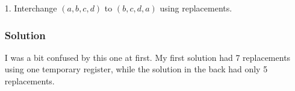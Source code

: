 
\begin{enumerate}
\item[1.] Interchange $\left(a, b, c, d\right)$ to $\left(b, c, d, a\right)$ using replacements.
\subsubsection*{Solution}
I was a bit confused by this one at first. My first solution had 7 replacements using one temporary register, while the solution in the back had only 5 replacements.
\end{enumerate}

